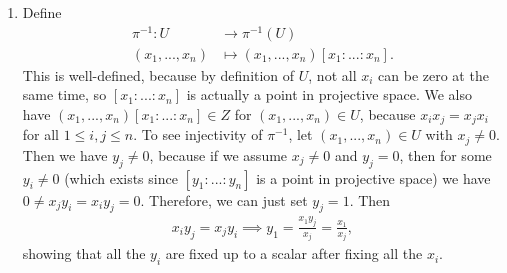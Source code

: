 \newcommand{\sheet}{3}




\maketitle{}

\begin{exercise}{1}
    \begin{enumerate}
        \item Define 
        \begin{align*}
            \pi^{-1}:U &\longrightarrow \pi^{-1}(U) \\
            (x_1,...,x_n)  &\mapsto (x_1,...,x_n)[x_1:...:x_n].
        \end{align*}
        This is well-defined, because by definition of $U$, not all
        $x_i$ can be zero at the same time, so $[x_1:...:x_n]$ is actually a
        point in projective space. We also have 
            $(x_1,...,x_n)[x_1:...:x_n]\in Z$ for $(x_1,...,x_n)\in U$,
            because $x_ix_j=x_jx_i$ for all $1\leq i,j \leq n.$
            To see injectivity of $\pi^{-1}$, let
            $(x_1,...,x_n)\in U$ with $x_j\not = 0$. Then we have $y_j\not = 0$, because
            if we assume $x_j\not =0$ and $y_j=0$, then for some $y_i\not =0$ 
            (which exists since $[y_1:...:y_n]$ is a point in projective space) 
            we have $0\not = x_jy_i= x_iy_j=0.$
            Therefore, we can just set $y_j=1$. Then 
            \begin{align*}
                x_iy_j=x_jy_i \implies y_1=\frac{x_1y_j}{x_j}=\frac{x_1}{x_j},
            \end{align*}
            showing that all the $y_i$ are fixed up to a scalar after fixing all the $x_i$.
    \end{enumerate}
\end{exercise}

